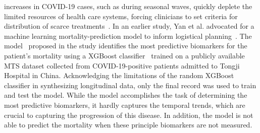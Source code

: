  increases in COVID-19 cases, such as during seasonal waves, quickly deplete the limited resources of health care systems, forcing clinicians to set criteria for distribution of scarce treatments~\cite{centersstrategies}. In an earlier study, Yan et al. advocated for a machine learning mortality-prediction model to inform logistical planning~\cite{yan2020interpretable}. The model~\cite{yan2020interpretable} proposed in the study identifies the most predictive biomarkers for the patient's mortality using a XGBoost classifier~\cite{chen2016xgboost} trained on a publicly available MTS dataset collected from COVID-19-positive patients admitted to Tongji Hospital in China. Acknowledging the limitations of the random XGBoost classifier in synthesizing longitudinal data, only the final record was used to train and test the model. While the model accomplishes the task of determining the most predictive biomarkers, it hardly captures the temporal trends, which are crucial to capturing the progression of this disease. In addition, the model is not able to predict the mortality when these principle biomarkers are not measured.

